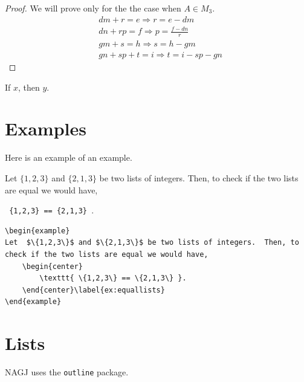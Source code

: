 \begin{proof} We will prove only for the the case when $A \in M_3$. \\
 \begin{align} 
&dm + r = e  \Rightarrow r = e-dm \label{eqn:1}\\
&dn + rp = f \Rightarrow p=\frac{f-dn}{r} \label{eqn:2}\\
&gm + s = h \Rightarrow s = h - gm \label{eqn:3}\\
&gn + sp + t = i \Rightarrow t  = i-sp-gn \label{eqn:4}
\end{align}
 
\end{proof} %
 

\begin{corollary}
If $x$, then $y$.
\end{corollary}



\section{Examples}\label{ex:x1}
Here is an example of an example.


\begin{example}
Let  $\{1,2,3\}$ and $\{2,1,3\}$ be two lists of integers.  Then, to check if the two lists are equal we would have,   
	\begin{center}
		\texttt{ \{1,2,3\} == \{2,1,3\} }.
	\end{center}\label{ex:equallists}
\end{example}


\begin{verbatim}
\begin{example}
Let  $\{1,2,3\}$ and $\{2,1,3\}$ be two lists of integers.  Then, to check if the two lists are equal we would have,   
	\begin{center}
		\texttt{ \{1,2,3\} == \{2,1,3\} }.
	\end{center}\label{ex:equallists}
\end{example}
\end{verbatim}



 \section{Lists}
 NAGJ uses the \verb|outline| package.   
  
